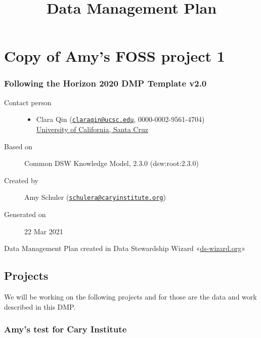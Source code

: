 \documentclass[
  english,
]{article}
\title{Data Management Plan}
\author{}
\date{}
\providecommand{\tightlist}{%
  \setlength{\itemsep}{0pt}\setlength{\parskip}{0pt}}
\begin{document}
\maketitle

\hypertarget{copy-of-amys-foss-project-1}{%
\section{Copy of Amy's FOSS project
1}\label{copy-of-amys-foss-project-1}}

\hypertarget{following-the-horizon-2020-dmp-template-v2.0}{%
\subsubsection{\texorpdfstring{Following the \textbf{Horizon 2020 DMP
Template
v2.0}}{Following the Horizon 2020 DMP Template v2.0}}\label{following-the-horizon-2020-dmp-template-v2.0}}

\begin{description}
\item[Contact person]
\begin{itemize}
\tightlist
\item
  {Clara Qin}
  ({\href{mailto:claraqin@ucsc.edu}{\nolinkurl{claraqin@ucsc.edu}}}, {{}
  0000-0002-9561-4704})\\
  \href{https://ror.org/03s65by71}{University of California, Santa Cruz}
\end{itemize}
\item[Based on]
Common DSW Knowledge Model, 2.3.0 ({{dsw}:{root}:{2.3.0}})
\item[Created by]
{Amy Schuler}
({\href{mailto:schulera@caryinstitute.org}{\nolinkurl{schulera@caryinstitute.org}}})
\item[Generated on]
22 Mar 2021
\end{description}

Data Management Plan created in Data Stewardship Wizard
«\href{https://ds-wizard.org}{ds-wizard.org}»

\hypertarget{dmp-projects}{}
\hypertarget{projects}{%
\subsection{Projects}\label{projects}}

We will be working on the following projects and for those are the data
and work described in this DMP.

\hypertarget{amys-test-for-cary-institute}{%
\subsubsection{Amy's test for Cary
Institute}\label{amys-test-for-cary-institute}}
\end{document}
